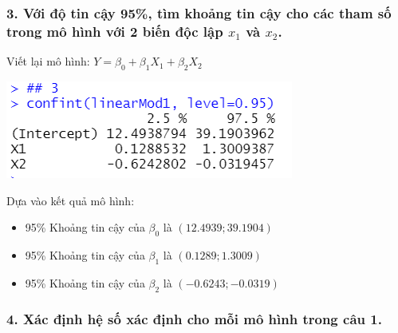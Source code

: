 \documentclass[a4paper]{article}
\theoremstyle{nonumberplain}
\begin{document}
\subsubsection*{3. Với độ tin cậy 95\%, tìm khoảng tin cậy cho các tham số trong mô hình với 2 biến độc lập $x_1$ và $x_2$.}
Viết lại mô hình: $Y = \beta_0 + \beta_1 X_1 + \beta_2 X_2$
\begin{center}
\includegraphics{bai3_3.PNG} 
\end{center}

Dựa vào kết quả mô hình:

\begin{itemize}
    \item 95\% Khoảng tin cậy của $\beta_0$ là $(12.4939;39.1904)$
    \item 95\% Khoảng tin cậy của $\beta_1$ là $(0.1289;1.3009)$
    \item 95\% Khoảng tin cậy của $\beta_2$ là $(-0.6243;-0.0319)$
\end{itemize}

\subsubsection*{4. Xác định hệ số xác định cho mỗi mô hình trong câu 1.}
\end{document}
